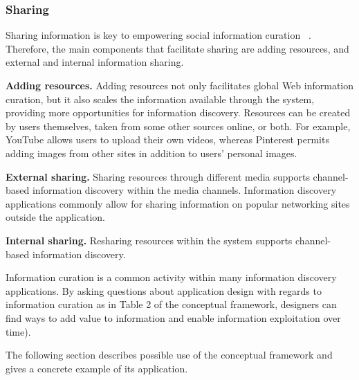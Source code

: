 {\subsubsection{Sharing}
Sharing information is key to empowering social information curation ~\cite{beagrie}. Therefore, the main components that facilitate sharing are adding resources, and external and internal information sharing.

\textbf{Adding resources.} Adding resources not only facilitates global Web information curation, but it also scales the information available through the system, providing more opportunities for information discovery. Resources can be created by users themselves, taken from some other sources online, or both. For example, YouTube allows users to upload their own videos, whereas Pinterest permits adding images from other sites in addition to users' personal images. 

\textbf{External sharing.} Sharing resources through different media supports channel-based information discovery within the media channels. Information discovery applications commonly allow for sharing information on popular networking sites outside the application.

\textbf{Internal sharing.} Resharing resources within the system supports channel-based information discovery. 
} %

Information curation is a common activity within many information discovery applications. By asking questions about application design with regards to information curation as in Table 2 of the conceptual framework, designers can find ways to add value to information and enable information exploitation over time).

The following section describes possible use of the conceptual framework and gives a concrete example of its application.